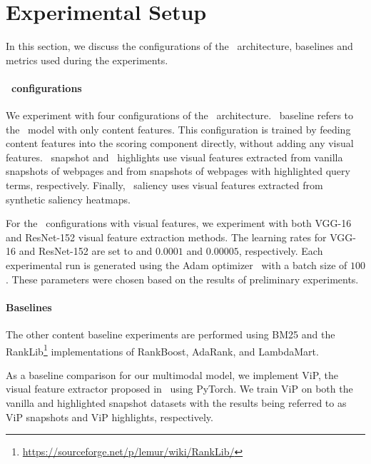 
\section{Experimental Setup}\label{sec:setup}
In this section, we discuss the configurations of the \modelname~architecture, baselines and metrics used during the experiments.


\paragraph{\modelname~configurations}
We experiment with four configurations of the \modelname~architecture.
\modelname~baseline refers to the \modelname~model with only content features.
This configuration is trained by feeding content features into the scoring component directly, without adding any visual features.
\modelname~snapshot and \modelname~highlights use visual features extracted from vanilla snapshots of webpages and from snapshots of webpages with highlighted query terms, respectively.
Finally, \modelname~saliency uses visual features extracted from synthetic saliency heatmaps.

For the \modelname~configurations with visual features, we experiment with both VGG-16 and ResNet-152 visual feature extraction methods.
The learning rates for VGG-16 and ResNet-152 are set to and $0.0001$ and $0.00005$, respectively. 
Each experimental run is generated using the Adam optimizer~\cite{kingma2014adam} with a batch size of $100$. These parameters were chosen based on the results of preliminary experiments.


\paragraph{Baselines}
The other content baseline experiments are performed using BM25 and the RankLib\footnote{\url{https://sourceforge.net/p/lemur/wiki/RankLib/}} implementations of RankBoost, AdaRank, and LambdaMart.

As a baseline comparison for our multimodal model, we implement ViP, the visual feature extractor proposed in~\citet{fan2017learning} using PyTorch. We train ViP on both the vanilla and highlighted snapshot datasets with the results being referred to as ViP snapshots and ViP highlights, respectively.


